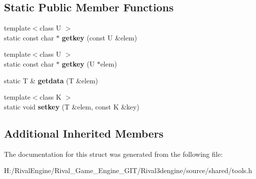 \subsection*{Static Public Member Functions}
\begin{DoxyCompactItemize}
\item 
\mbox{\label{structhashnameset_a33a5a5de61bdd0f6a3c51901f1f35cf1}} 
{\footnotesize template$<$class U $>$ }\\static const char $\ast$ {\bfseries getkey} (const U \&elem)
\item 
\mbox{\label{structhashnameset_a2c53f3c121f1ba50e87e18edebb49a53}} 
{\footnotesize template$<$class U $>$ }\\static const char $\ast$ {\bfseries getkey} (U $\ast$elem)
\item 
\mbox{\label{structhashnameset_a4e24ee4456265787e539368b10db459e}} 
static T \& {\bfseries getdata} (T \&elem)
\item 
\mbox{\label{structhashnameset_a959f269b8e5508d152241b9650435a7f}} 
{\footnotesize template$<$class K $>$ }\\static void {\bfseries setkey} (T \&elem, const K \&key)
\end{DoxyCompactItemize}
\subsection*{Additional Inherited Members}


The documentation for this struct was generated from the following file\+:\begin{DoxyCompactItemize}
\item 
H\+:/\+Rival\+Engine/\+Rival\+\_\+\+Game\+\_\+\+Engine\+\_\+\+G\+I\+T/\+Rival3dengine/source/shared/tools.\+h\end{DoxyCompactItemize}
